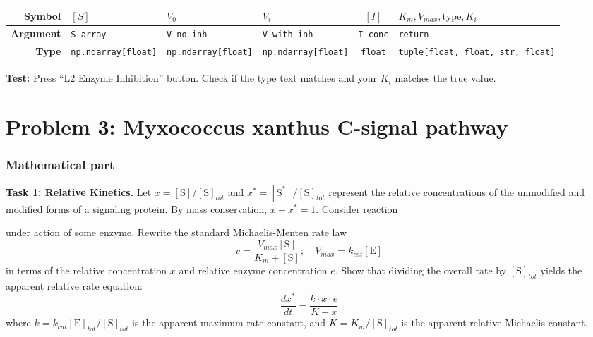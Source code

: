 \documentclass[11pt]{article}
\begin{document}
\begin{center}
\renewcommand{\arraystretch}{2.0}
\begin{tabularx}{\textwidth}{r | >{\centering\arraybackslash}X | >{\centering\arraybackslash}X | >{\centering\arraybackslash}X | c | >{\centering\arraybackslash}X}
\toprule
\textbf{Symbol} & $[S]$ & $V_0$ & $V_i$ & $[I]$ & $K_m, V_{max}, \text{type}, K_i$ \\ \midrule
\textbf{Argument} & \lstinline|S_array| & \lstinline|V_no_inh| & \lstinline|V_with_inh| & \lstinline|I_conc| & \lstinline|return| \\ \midrule
\textbf{Type} & \lstinline|np.ndarray[float]| & \lstinline|np.ndarray[float]| & \lstinline|np.ndarray[float]| & \lstinline|float| & \lstinline|tuple[float, float, str, float]| \\
\bottomrule
\end{tabularx}
\end{center}

\textbf{Test:} Press ``L2 Enzyme Inhibition'' button. Check if the type text matches and your $K_i$ matches the true value.

\section*{Problem 3: Myxococcus xanthus C-signal pathway}

\subsubsection*{Mathematical part}

\textbf{Task 1: Relative Kinetics.} 
Let $x = [\text{S}]/[\text{S}]_{tot}$ and $x^* = [\text{S}^*]/[\text{S}]_{tot}$ represent the relative concentrations of the unmodified and modified forms of a signaling protein. 
By mass conservation, $x + x^* = 1$. 
Consider reaction
\begin{center}
	
\end{center}
under action of some enzyme.
Rewrite the standard Michaelis-Menten rate law 
$$
v = \frac{V_{max}[\text{S}]}{K_m + [\text{S}]}; \quad V_{max} = k_{cat} [\text{E}]
$$ 
in terms of the relative concentration $x$ and relative enzyme concentration $e$. Show that dividing the overall rate by $[\text{S}]_{tot}$ yields the apparent relative rate equation:
$$
\frac{dx^*}{dt} = \frac{k \cdot x \cdot e}{K + x}
$$
where $k = k_{cat}[\text{E}]_{tot}/[\text{S}]_{tot}$ is the apparent maximum rate constant, and $K = K_m/[\text{S}]_{tot}$ is the apparent relative Michaelis constant.
\end{document}
